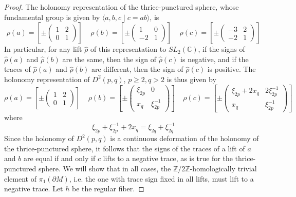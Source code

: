 \documentclass{article}
\theoremstyle{plain}
\theoremstyle{definition}
\theoremstyle{plain}
\theoremstyle{plain}
\theoremstyle{plain}
\theoremstyle{remark}
\theoremstyle{remark}
\theoremstyle{plain}
\theoremstyle{plain}
\begin{document}
\begin{proof}
The holonomy representation of the thrice-punctured sphere, whose fundamental group is given by $\langle a, b, c \mid c = ab \rangle$, is 
\begin{equation}
	\rho(a) = \left[\pm\begin{pmatrix}1 & 2 \\ 0 & 1\end{pmatrix}\right] \ \ \ \ \ \rho(b) = \left[\pm\begin{pmatrix}1&0\\-2&1\end{pmatrix}\right] \ \ \ \ \ \rho(c) = \left[\pm\begin{pmatrix}-3&2\\-2&1\end{pmatrix}\right]
\end{equation}
In particular, for any lift $\hat{\rho}$ of this representation to $SL_2(\mathbb{C})$, if the signs of $\hat{\rho}(a)$ and $\hat{\rho}(b)$ are the same, then the sign of $\hat{\rho}(c)$ is negative, and if the traces of $\hat{\rho}(a)$ and $\hat{\rho}(b)$ are different, then the sign of $\hat{\rho}(c)$ is positive. The holonomy representation of $D^2(p, q)$, $p \geq 2, q > 2$ is thus given by 
\begin{equation}
	\rho(a) = \left[\pm \begin{pmatrix}1 & 2 \\ 0 & 1\end{pmatrix}\right] \ \ \ \ \ \rho(b) = \left[\pm\begin{pmatrix}\xi_{2p}&0\\x_q&\xi_{2p}^{-1}\end{pmatrix}\right] \ \ \ \ \ \rho(c) = \left[\pm\begin{pmatrix}\xi_{2p} + 2x_q & 2\xi_{2p}^{-1} \\ x_q & \xi_{2p}^{-1}\end{pmatrix}\right]
\end{equation}
where
\begin{equation}
	\xi_{2p} + \xi_{2p}^{-1} + 2x_q = \xi_{2q} + \xi_{2q}^{-1}
\end{equation}
Since the holonomy of $D^2(p, q)$ is a continuous deformation of the holonomy of the thrice-punctured sphere, it follows that the signs of the traces of a lift of $a$ and $b$ are equal if and only if $c$ lifts to a negative trace, as is true for the thrice-punctured sphere. We will show that in all cases, the $\mathbb{Z}/2\mathbb{Z}$-homologically trivial element of $\pi_1(\partial M)$, i.e. the one with trace sign fixed in all lifts, must lift to a negative trace. Let $h$ be the regular fiber. 


\end{proof}
\end{document}
